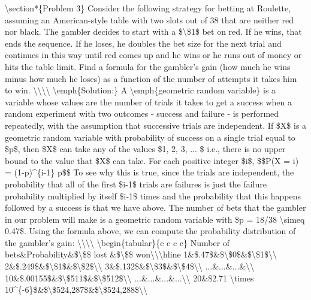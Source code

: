 \textbackslash{}section*\{Problem 3\}  
Consider the following strategy for betting at Roulette, assuming an American-style table with two slots out of 38 that are neither red nor black.  The gambler decides to start with a \$\textbackslash{}\$1\$ bet on red.  If he wins, that ends the sequence.  If he loses, he doubles the bet size for the next trial and continues in this way until red comes up and he wins or he runs out of money or hits the table limit.   Find a formula for the gambler's gain (how much he wins minus how much he loses)  as a function of the number of attempts it takes him to win.
\textbackslash{}\textbackslash{}\textbackslash{}\textbackslash{}
\textbackslash{}emph\{Solution:\}  A \textbackslash{}emph\{geometric random variable\} is a variable whose values are the number of trials it takes to get a success when a random experiment with two outcomes - success and failure - is performed repeatedly, with the assumption that successive trials are independent.    If \$X\$ is a geometric random variable with probability of success on a single trial equal to \$p\$, then \$X\$ can take any of the values \$1, 2, 3, ... \$ i.e., there is no upper bound to the value that \$X\$ can take.  For each positive integer \$i\$, 
\$\$P(X = i) = (1-p)\^{}\{i-1\} p\$\$
To see why this is true, since the trials are independent, the probability that all of the first \$i-1\$ trials are failures is just the failure probability multiplied by itself \$i-1\$ times and the probability that this happens followed by a success is that we have above.  The number of bets that the gambler in our problem will make is a geometric random variable with \$p = 18/38  \textbackslash{}simeq 0.47\$.
Using the formula above, we can compute the probability distribution of the gambler's gain:
\textbackslash{}\textbackslash{}\textbackslash{}\textbackslash{}
\textbackslash{}begin\{tabular\}\{c c c c\}
Number of bets\&Probability\&\$\textbackslash{}\$\$ lost \&\$\textbackslash{}\$\$ won\textbackslash{}\textbackslash{}\textbackslash{}hline
1\&\$.47\$\&\$\textbackslash{}\$0\$\&\$\textbackslash{}\$1\$\textbackslash{}\textbackslash{}
2\&\$.249\$\&\$\textbackslash{}\$1\$\&\$\textbackslash{}\$2\$\textbackslash{}\textbackslash{}
3\&\$.132\$\&\$\textbackslash{}\$3\$\&\$\textbackslash{}\$4\$\textbackslash{}\textbackslash{}
...\&...\&...\&\textbackslash{}\textbackslash{}
10\&\$.00155\$\&\$\textbackslash{}\$511\$\&\$\textbackslash{}\$512\$\textbackslash{}\textbackslash{}
...\&...\&...\&...\textbackslash{}\textbackslash{}
20\&\$2.71 \textbackslash{}times 10\^{}\{-6\}\$\&\$\textbackslash{}\$524,287\$\&\$\textbackslash{}\$524,288\$\textbackslash{}\textbackslash{}
